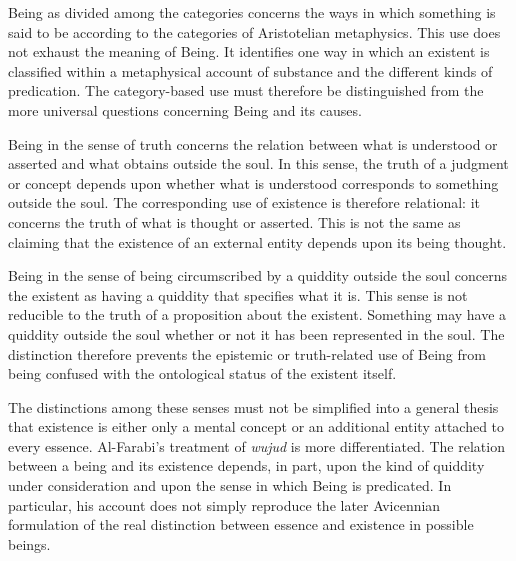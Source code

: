 Being as divided among the categories
concerns the ways in which something is
said to be according to the categories
of Aristotelian metaphysics. This use
does not exhaust the meaning of Being.
It identifies one way in which an existent
is classified within a metaphysical
account of substance and the different
kinds of predication. The category-based
use must therefore be distinguished
from the more universal questions
concerning Being and its causes.

\label{para:VS.B01.P01.C08.S12.SS04.P003}

Being in the sense of truth concerns
the relation between what is understood
or asserted and what obtains outside
the soul. In this sense, the truth of
a judgment or concept depends upon
whether what is understood corresponds
to something outside the soul. The
corresponding use of existence is
therefore relational: it concerns the
truth of what is thought or asserted.
This is not the same as claiming that
the existence of an external entity
depends upon its being thought.
\citep[sec.~3.4]{MennAlFarabiMetaphysicsSEP2026}

\label{para:VS.B01.P01.C08.S12.SS04.P004}

Being in the sense of being circumscribed
by a quiddity outside the soul concerns
the existent as having a quiddity that
specifies what it is. This sense is not
reducible to the truth of a proposition
about the existent. Something may have
a quiddity outside the soul whether or
not it has been represented in the soul.
The distinction therefore prevents the
epistemic or truth-related use of Being
from being confused with the ontological
status of the existent itself.
\citep[sec.~3.4]{MennAlFarabiMetaphysicsSEP2026}

\label{para:VS.B01.P01.C08.S12.SS04.P005}

The distinctions among these senses
must not be simplified into a general
thesis that existence is either only
a mental concept or an additional
entity attached to every essence.
Al-Farabi's treatment of \textit{wujud}
is more differentiated. The relation
between a being and its existence
depends, in part, upon the kind of
quiddity under consideration and
upon the sense in which Being is
predicated. In particular, his account
does not simply reproduce the later
Avicennian formulation of the real
distinction between essence and
existence in possible beings.
\citep[sec.~3.4]{MennAlFarabiMetaphysicsSEP2026}


